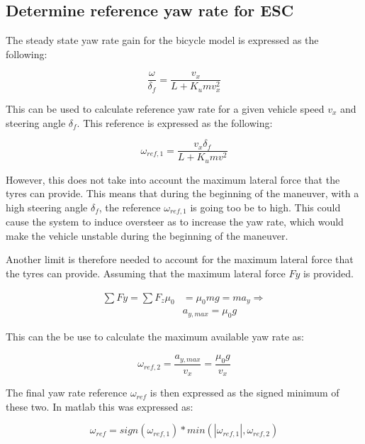 \subsection{Determine reference yaw rate for ESC}

The steady state yaw rate gain for the bicycle model is expressed as the following:

\begin{equation}
    \frac{\omega}{\delta_f} = \frac{v_x}{L + K_u m v_x^2}
\end{equation}

This can be used to calculate reference yaw rate for a given vehicle speed $v_x$ and steering angle $\delta_f$. This reference is expressed as the following:

\begin{equation*}
    \omega_{ref,1} = \frac{v_x \delta_f}{L+K_u m v^2}
\end{equation*}

However, this does not take into account the maximum lateral force that the tyres can provide. This means that during the beginning of the maneuver, with a high steering angle $\delta_f$, the reference $\omega_{ref,1}$ is going too be to high. This could cause the system to induce oversteer as to increase the yaw rate, which would make the vehicle unstable during the beginning of the maneuver. 

Another limit is therefore needed to account for the maximum lateral force that the tyres can provide. Assuming that the maximum lateral force $Fy$ is provided. 

\begin{align*}
    \sum Fy = \sum F_z \mu_{0} & = \mu_0 mg = m a_y \Rightarrow  \\
    & a_{y,max} = \mu_0 g
\end{align*}

This can the be use to calculate the maximum available yaw rate as:

\begin{equation*}
    \omega_{ref,2} = \frac{a_{y,max}}{v_x} = \frac{\mu_0 g}{v_x} 
\end{equation*}

The final yaw rate reference $\omega_{ref}$ is then expressed as the signed minimum of these two. In matlab this was expressed as:

\begin{equation*}
    \omega_{ref} = sign(\omega_{ref,1})*min(|\omega_{ref,1}|,\omega_{ref,2})
\end{equation*}

